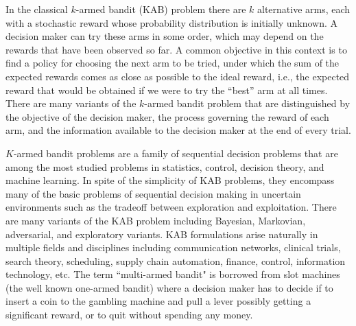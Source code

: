 %


%
%
%
%
%
%
%

In the classical $k$-armed bandit (KAB) problem there are $k$ alternative arms, each with a stochastic reward whose probability distribution is initially unknown. A decision maker can try these arms in some order, which may depend on the rewards that have been observed so far. A common objective in this context is to find a policy for choosing the next arm to be tried, under which the sum of the expected rewards comes as close as possible to the ideal reward, i.e., the expected reward that would be obtained if we were to try the ``best'' arm at all times.
There are many variants of the $k$-armed bandit problem that are distinguished by the objective of the decision maker, the process governing the reward of each arm, and the information available to the decision maker at the end of every trial.

$K$-armed bandit problems are a family of sequential decision problems that are among the most studied problems in statistics, control, decision theory, and machine learning. In spite of the simplicity of KAB problems, they encompass many of the basic problems of sequential decision making in uncertain environments such as the tradeoff between exploration and exploitation.
There are many variants of the KAB problem including Bayesian, Markovian, adversarial, and exploratory variants. KAB formulations arise naturally in multiple fields and disciplines including communication networks, clinical trials, search theory, scheduling, supply chain automation, finance, control, information technology, etc.
The term ``multi-armed bandit" is borrowed from slot machines (the well known one-armed bandit) where a decision maker has to decide if to insert a coin to the gambling machine and pull a lever possibly getting a significant reward, or to quit without spending any money.

